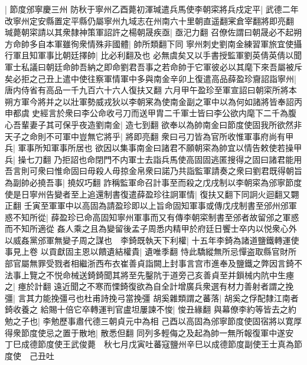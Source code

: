 |{
	節度邠寧慶三州}
防秋于寧州乙酉薨初渾瑊遣兵馬使李朝寀將兵戍定平|{
	武德二年改寧州定安縣置定平縣仍屬寧州九域志在州南六十里朝直遥翻宷倉宰翻將即亮翻}
瑊薨朝寀請以其衆隸神策軍詔許之楊朝晟疾亟|{
	亟汜力翻}
召僚佐謂曰朝晟必不起朔方命帥多自本軍雖徇衆情殊非國體|{
	帥所類翻下同}
寧州刺史劉南金練習軍旅宜使攝行軍且知軍事比朝廷擇帥|{
	比必利翻及也}
必無虞矣又以手書授監軍劉英倩英倩以聞軍士私議曰朝廷命帥吾納之即命劉君吾事之若命帥于它軍彼必以其麾下來吾屬被斥矣必拒之己丑上遣中使往察軍情軍中多與南金辛卯上復遣高品薛盈珍齎詔詣寧州|{
	唐内侍省有高品一千九百六十六人復扶又翻}
六月甲午盈珍至軍宣詔曰朝寀所將本朔方軍今將并之以壯軍勢威戎狄以李朝宷為使南金副之軍中以為何如諸將皆奉詔丙申都虞史經言於衆曰李公命收弓刀而送甲胄二千軍士皆曰李公欲内麾下二千為腹心吾輩妻子其可保乎夜造劉南金|{
	造七到翻}
欲奉以為帥南金曰節度使固我所欲然非天子之命則不可軍中豈無它將乎|{
	將即亮翻}
衆曰弓刀皆為官所收惟軍事府尚有甲兵|{
	軍事所知軍事所居也}
欲因以集事南金曰諸君不願朝寀為帥宜以情告敕使若操甲兵|{
	操七刀翻}
乃拒詔也命閉門不内軍士去詣兵馬使高固固逃匿搜得之固曰諸君能用吾言則可衆曰惟命固曰毋殺人毋掠金帛衆曰諾乃共詣監軍請奏之衆曰劉君既得朝旨為副帥必撓吾事|{
	撓奴巧翻}
詐稱監軍命召計事至而殺之戊戌制以李朝寀為邠寧節度使是日寧州告變者至上追還制書復遣薛盈珍往詗軍情|{
	復扶又翻下同詗火迴翻又翾正翻}
壬寅至軍軍中以高固為請盈珍即以上旨命固知軍事或傳戊戌制書至邠州邠軍惑不知所從|{
	薛盈珍已命高固知寧州軍事而又有傳李朝寀制書至邠者故留邠之軍惑而不知所適從}
姦人乘之且為變留後孟子周悉内精甲於府廷日饗士卒内以悦衆心外以威姦黨邠軍無變子周之謀也　李錡既執天下利權|{
	十五年李錡為諸道鹽鐵轉運使事見上卷}
以貢獻固主恩以饋遺結權貴|{
	遺唯季翻}
恃此驕縱無所忌憚盗取縣官財所部官屬無罪受戮者相繼浙西布衣崔善貞詣闕上封事言宫市進奉及鹽鐵之弊因言錡不法事上覽之不悦命械送錡錡聞其將至先鑿阬于道旁己亥善貞至并鎻械内阬中生瘞之|{
	瘞於計翻}
遠近聞之不寒而慄錡復欲為自全計增廣兵衆選有材力善射者謂之挽彊|{
	言其力能挽彊弓也杜甫詩挽弓當挽彊}
胡奚雜類謂之蕃落|{
	胡奚之俘配隸江南者錡收養之}
給賜十倍它卒轉運判官盧坦屢諫不悛|{
	悛丑緣翻}
與幕僚李約等皆去之約勉之子也|{
	李勉歷事肅代德三朝貞元中為相}
己酉以高固為邠寧節度使固宿將以寛厚得衆節度使忌之置于散地|{
	散悉但翻}
同列多輕侮之及起為帥一無所報復軍中遂安　丁巳成德節度使王武俊薨　秋七月戊寅吐蕃寇鹽州辛巳以成德節度副使王士真為節度使　己丑吐

